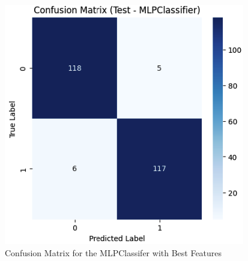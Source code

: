 \documentclass[conference]{IEEEtran}
\begin{document}
\begin{figure}[H]
    \centering
    \includegraphics[width=1\linewidth]{images/ConfusionMatrixNNBestFeatures.png}
    \caption{Confusion Matrix for the MLPClassifer with Best Features}
    \label{fig:NN-Confusion-BestFeatures}
\end{figure}
\end{document}
